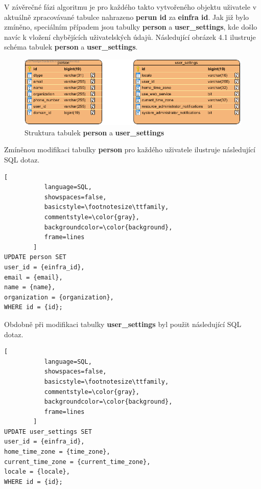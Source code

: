 \documentclass[
  printed, %
  twoside, %
  table,   %
  nolof,     %
  nolot,     %
]{fithesis3}
\begin{document}
\par

V závěrečné fázi algoritmu je pro každého takto vytvořeného objektu uživatele v aktuálně zpracovávané tabulce nahrazeno \textbf{perun id} za \textbf{einfra id}. Jak již bylo zmíněno, speciálním případem jsou tabulky \textbf{person} a \textbf{user\_settings}, kde došlo navíc k vložení chybějících uživatelských údajů. Následující obrázek 4.1 ilustruje schéma tabulek \textbf{person} a \textbf{user\_settings}. 

\begin{figure}[H]
\label{fig:erd-person-user-settings}
\caption{Struktura tabulek \textbf{person} a \textbf{user\_settings}}
\centering
\includegraphics[width=12.8cm]{pics/erd-person-user_settings} 
\end{figure}
\par 

Zmíněnou modifikaci tabulky \textbf{person} pro každého uživatele ilustruje následující SQL dotaz.

\begin{lstlisting}[
           language=SQL,
           showspaces=false,
           basicstyle=\footnotesize\ttfamily,
           commentstyle=\color{gray},
           backgroundcolor=\color{background},
           frame=lines
        ]
UPDATE person SET 
user_id = {einfra_id},
email = {email},
name = {name},
organization = {organization},
WHERE id = {id};
\end{lstlisting}

Obdobně při modifikaci tabulky \textbf{user\_settings} byl použit následující SQL dotaz. 

\begin{lstlisting}[
           language=SQL,
           showspaces=false,
           basicstyle=\footnotesize\ttfamily,
           commentstyle=\color{gray},
           backgroundcolor=\color{background},
           frame=lines
        ]
UPDATE user_settings SET 
user_id = {einfra_id},
home_time_zone = {time_zone},
current_time_zone = {current_time_zone},
locale = {locale},
WHERE id = {id};
\end{lstlisting}
\end{document}

